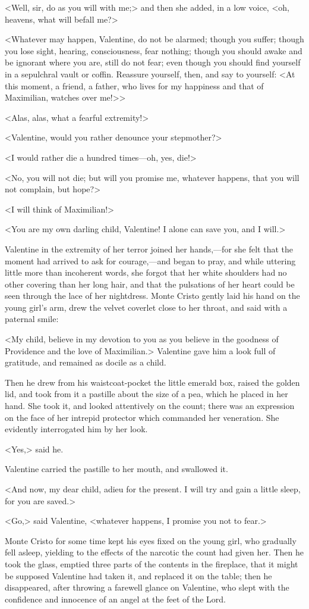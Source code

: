  <Well, sir, do as you will with me;> and then she added, in a low voice, <oh, heavens, what will befall me?> 

 <Whatever may happen, Valentine, do not be alarmed; though you suffer; though you lose sight, hearing, consciousness, fear nothing; though you should awake and be ignorant where you are, still do not fear; even though you should find yourself in a sepulchral vault or coffin. Reassure yourself, then, and say to yourself: <At this moment, a friend, a father, who lives for my happiness and that of Maximilian, watches over me!>> 

 <Alas, alas, what a fearful extremity!> 

 <Valentine, would you rather denounce your stepmother?> 

 <I would rather die a hundred times—oh, yes, die!> 

 <No, you will not die; but will you promise me, whatever happens, that you will not complain, but hope?> 

 <I will think of Maximilian!> 

 <You are my own darling child, Valentine! I alone can save you, and I will.> 

 Valentine in the extremity of her terror joined her hands,—for she felt that the moment had arrived to ask for courage,—and began to pray, and while uttering little more than incoherent words, she forgot that her white shoulders had no other covering than her long hair, and that the pulsations of her heart could be seen through the lace of her nightdress. Monte Cristo gently laid his hand on the young girl's arm, drew the velvet coverlet close to her throat, and said with a paternal smile: 

 <My child, believe in my devotion to you as you believe in the goodness of Providence and the love of Maximilian.> Valentine gave him a look full of gratitude, and remained as docile as a child. 

 Then he drew from his waistcoat-pocket the little emerald box, raised the golden lid, and took from it a pastille about the size of a pea, which he placed in her hand. She took it, and looked attentively on the count; there was an expression on the face of her intrepid protector which commanded her veneration. She evidently interrogated him by her look. 

 <Yes,> said he. 

 Valentine carried the pastille to her mouth, and swallowed it. 

 <And now, my dear child, adieu for the present. I will try and gain a little sleep, for you are saved.> 

 <Go,> said Valentine, <whatever happens, I promise you not to fear.> 

 Monte Cristo for some time kept his eyes fixed on the young girl, who gradually fell asleep, yielding to the effects of the narcotic the count had given her. Then he took the glass, emptied three parts of the contents in the fireplace, that it might be supposed Valentine had taken it, and replaced it on the table; then he disappeared, after throwing a farewell glance on Valentine, who slept with the confidence and innocence of an angel at the feet of the Lord. 